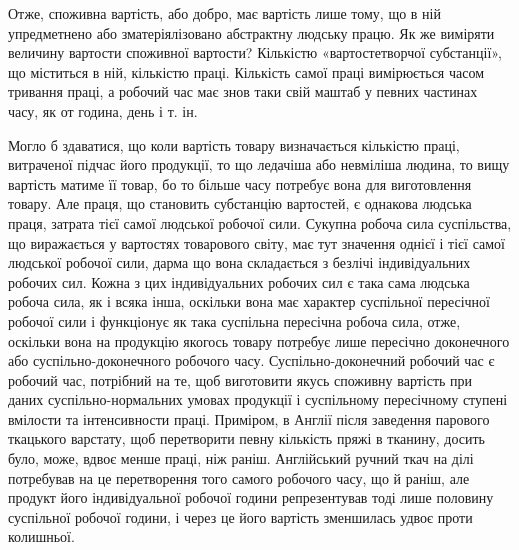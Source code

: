 Отже, споживна вартість, або добро, має вартість лише тому,
що в ній упредметнено або зматеріялізовано абстрактну людську
працю. Як же виміряти величину вартости споживної вартости?
Кількістю «вартостетворчої субстанції», що міститься в ній,
кількістю праці. Кількість самої праці вимірюється часом тривання
праці, а робочий час має знов таки свій маштаб у певних
частинах часу, як от година, день і т. ін.

Могло б здаватися, що коли вартість товару визначається
кількістю праці, витраченої підчас його продукції, то що ледачіша
або невміліша людина, то вищу вартість матиме її товар,
бо то більше часу потребує вона для виготовлення товару. Але
праця, що становить субстанцію вартостей, є однакова людська
праця, затрата тієї самої людської робочої сили. Сукупна робоча
сила суспільства, що виражається у вартостях товарового світу,
має тут значення однієї і тієї самої людської робочої сили, дарма
що вона складається з безлічі індивідуальних робочих сил. Кожна
з цих індивідуальних робочих сил є така сама людська робоча
сила, як і всяка інша, оскільки вона має характер суспільної
пересічної робочої сили і функціонує як така суспільна пересічна
робоча сила, отже, оскільки вона на продукцію якогось товару
потребує лише пересічно доконечного або суспільно-доконечного
робочого часу. Суспільно-доконечний робочий час є робочий
час, потрібний на те, щоб виготовити якусь споживну вартість
при даних суспільно-нормальних умовах продукції і суспільному
пересічному ступені вмілости та інтенсивности праці. Приміром,
в Англії після заведення парового ткацького варстату,
щоб перетворити певну кількість пряжі в тканину, досить було,
може, вдвоє менше праці, ніж раніш. Англійський ручний ткач
на ділі потребував на це перетворення того самого робочого часу,
що й раніш, але продукт його індивідуальної робочої години
репрезентував тоді лише половину суспільної робочої години, і
через це його вартість зменшилась удвоє проти колишньої.

